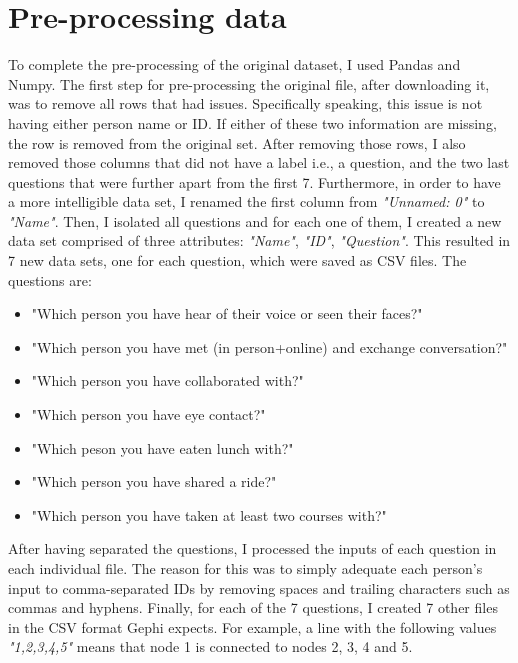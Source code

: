 \section{Pre-processing data}
To complete the pre-processing of the original dataset, I used Pandas and Numpy. The first step for pre-processing the original file, after downloading it, was to remove all rows that had issues. Specifically speaking, this issue is not having either person name or ID. If either of these two information are missing, the row is removed from the original set. After removing those rows, I also removed those columns that did not have a label i.e., a question, and the two last questions that were further apart from the first 7. Furthermore, in order to have a more intelligible data set, I renamed the first column from \textit{"Unnamed: 0"} to \textit{"Name"}. Then, I isolated all questions and for each one of them, I created a new data set comprised of three attributes: \textit{"Name"}, \textit{"ID"}, \textit{"Question"}. This resulted in 7 new data sets, one for each question, which were saved as CSV files. The questions are:

\begin{itemize}
    \item "Which person you have hear of their voice or seen their faces?"
    \item "Which person you have met (in person+online) and exchange conversation?"
    \item "Which person you have collaborated with?"
    \item "Which person you have eye contact?"
    \item "Which peson you have eaten lunch with?"
    \item "Which person you have shared a ride?"
    \item "Which person you have taken at least two courses with?"
\end{itemize}

After having separated the questions, I processed the inputs of each question in each individual file. The reason for this was to simply adequate each person's input to comma-separated IDs by removing spaces and trailing characters such as commas and hyphens. Finally, for each of the 7 questions, I created 7 other files in the CSV format Gephi expects. For example, a line with the following values \textit{"1,2,3,4,5"} means that node 1 is connected to nodes 2, 3, 4 and 5.